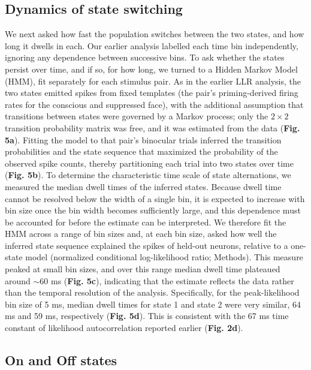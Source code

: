 \documentclass{article}
\begin{document}
\subsection*{Dynamics of state switching}

We next asked how fast the population switches between the two states, and how long it dwells in each. Our earlier analysis labelled each time bin independently, ignoring any dependence between successive bins. To ask whether the states persist over time, and if so, for how long, we turned to a Hidden Markov Model (HMM), fit separately for each stimulus pair. As in the earlier LLR analysis, the two states emitted spikes from fixed templates (the pair's priming-derived firing rates for the conscious and suppressed face), with the additional assumption that transitions between states were governed by a Markov process; only the $2 \times 2$ transition probability matrix was free, and it was estimated from the data (\textbf{Fig. 5a}). Fitting the model to that pair's binocular trials inferred the transition probabilities and the state sequence that maximized the probability of the observed spike counts, thereby partitioning each trial into two states over time (\textbf{Fig. 5b}). To determine the characteristic time scale of state alternations, we measured the median dwell times of the inferred states. Because dwell time cannot be resolved below the width of a single bin, it is expected to increase with bin size once the bin width becomes sufficiently large, and this dependence must be accounted for before the estimate can be interpreted. We therefore fit the HMM across a range of bin sizes and, at each bin size, asked how well the inferred state sequence explained the spikes of held-out neurons, relative to a one-state model (normalized conditional log-likelihood ratio; Methods). This measure peaked at small bin sizes, and over this range median dwell time plateaued around ${\sim}60$ ms (\textbf{Fig. 5c}), indicating that the estimate reflects the data rather than the temporal resolution of the analysis. Specifically, for the peak-likelihood bin size of 5 ms, median dwell times for state 1 and state 2 were very similar, 64 ms and 59 ms, respectively (\textbf{Fig. 5d}). This is consistent with the 67 ms time constant of likelihood autocorrelation reported earlier (\textbf{Fig. 2d}).

\subsection*{On and Off states}
\end{document}
